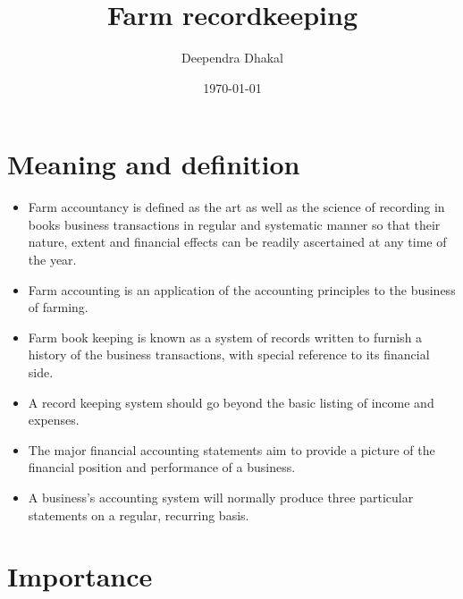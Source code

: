 \documentclass[12pt,ignorenonframetext,aspectratio=169]{beamer}
\title{\insertsectionhead}
  {
    \definecolor{white}{rgb}{0.776,0.357,0.157}
    \definecolor{iqss@orange}{rgb}{1,1,1}
    \ifnum \insertmainframenumber > \insertframenumber
    \frame{
      \frametitle{\iqsssectiontitleheader}
      \tableofcontents[currentsection]
    }
    \else
    \frame{
      \frametitle{Backup Slides}
      \tableofcontents[sectionstyle=shaded/shaded,subsectionstyle=shaded/shaded/shaded]
    }
    \fi
  }
\title[]{Farm recordkeeping}
\author[
        Deependra Dhakal
    ]{Deependra Dhakal}
\institute[
    ]{
    GAASC, Baitadi \and Tribhuwan University
    }
\date[
      \today
  ]{
      \today
        }
\providecommand{\tightlist}{%
  \setlength{\itemsep}{0pt}\setlength{\parskip}{0pt}}
\begin{document}
  \begin{frame}[plain]
  \titlepage
  \end{frame}



\hypertarget{meaning-and-definition}{%
\section{Meaning and definition}\label{meaning-and-definition}}

\begin{frame}{}
\protect\hypertarget{section}{}
\begin{itemize}
\tightlist
\item
  Farm accountancy is defined as the art as well as the science of
  recording in books business transactions in regular and systematic
  manner so that their nature, extent and financial effects can be
  readily ascertained at any time of the year.
\item
  Farm accounting is an application of the accounting principles to the
  business of farming.
\item
  Farm book keeping is known as a system of records written to furnish a
  history of the business transactions, with special reference to its
  financial side.
\end{itemize}
\end{frame}

\begin{frame}{}
\protect\hypertarget{section-1}{}
\begin{itemize}
\tightlist
\item
  A record keeping system should go beyond the basic listing of income
  and expenses.
\item
  The major financial accounting statements aim to provide a picture of
  the financial position and performance of a business.
\item
  A business's accounting system will normally produce three particular
  statements on a regular, recurring basis.
\end{itemize}
\end{frame}

\hypertarget{importance}{%
\section{Importance}\label{importance}}
\end{document}
